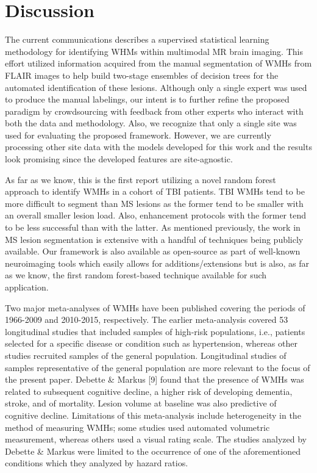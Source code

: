 \documentclass[11pt,]{article}
\begin{document}
\section{Discussion}\label{discussion}

The current communications describes a supervised statistical learning
methodology for identifying WHMs within multimodal MR brain imaging.
This effort utilized information acquired from the manual segmentation
of WMHs from FLAIR images to help build two-stage ensembles of decision
trees for the automated identification of these lesions. Although only a
single expert was used to produce the manual labelings, our intent is to
further refine the proposed paradigm by crowdsourcing with feedback from
other experts who interact with both the data and methodology. Also, we
recognize that only a single site was used for evaluating the proposed
framework. However, we are currently processing other site data with the
models developed for this work and the results look promising since the
developed features are site-agnostic.

As far as we know, this is the first report utilizing a novel random
forest approach to identify WMHs in a cohort of TBI patients. TBI WMHs
tend to be more difficult to segment than MS lesions as the former tend
to be smaller with an overall smaller lesion load. Also, enhancement
protocols with the former tend to be less successful than with the
latter. As mentioned previously, the work in MS lesion segmentation is
extensive with a handful of techniques being publicly available. Our
framework is also available as open-source as part of well-known
neuroimaging tools which easily allows for additions/extensions but is
also, as far as we know, the first random forest-based technique
available for such application.

Two major meta-analyses of WMHs have been published covering the periods
of 1966-2009 and 2010-2015, respectively. The earlier meta-analysis
covered 53 longitudinal studies that included samples of high-risk
populations, i.e., patients selected for a specific disease or condition
such as hypertension, whereas other studies recruited samples of the
general population. Longitudinal studies of samples representative of
the general population are more relevant to the focus of the present
paper. Debette \& Markus {[}9{]} found that the presence of WMHs was
related to subsequent cognitive decline, a higher risk of developing
dementia, stroke, and of mortality. Lesion volume at baseline was also
predictive of cognitive decline. Limitations of this meta-analysis
include heterogeneity in the method of measuring WMHs; some studies used
automated volumetric measurement, whereas others used a visual rating
scale. The studies analyzed by Debette \& Markus were limited to the
occurrence of one of the aforementioned conditions which they analyzed
by hazard ratios.
\end{document}
